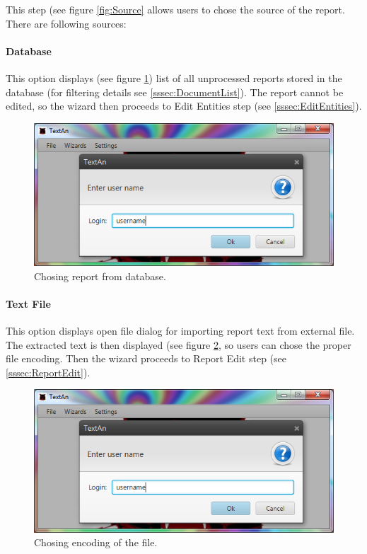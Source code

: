 \documentclass[12pt,a4paper]{report}
\begin{document}
This step (see figure \ref{fig:Source} allows users to chose the source of the
report. There are following sources:

\paragraph{Database} This option displays (see figure \ref{fig:Database}) list
of all unprocessed reports stored in the database (for filtering details see
\ref{sssec:DocumentList}).
The report cannot be edited, so the wizard then proceeds to Edit Entities step (see \ref{sssec:EditEntities}).

\begin{figure}[!htb]
        \centering
        \includegraphics[width=\textwidth]{Images/database}
        \caption{Chosing report from database.}
        \label{fig:Database}
\end{figure}

\paragraph{Text File} This option displays open file dialog for importing
report text from external file. The extracted text is then displayed (see
figure \ref{fig:TextFile}, so users can chose the proper file encoding. Then
the wizard proceeds to Report Edit step (see \ref{sssec:ReportEdit}).

\begin{figure}[!htb]
        \centering
        \includegraphics[width=\textwidth]{Images/textfile}
        \caption{Chosing encoding of the file.}
        \label{fig:TextFile}
\end{figure}
\end{document}

